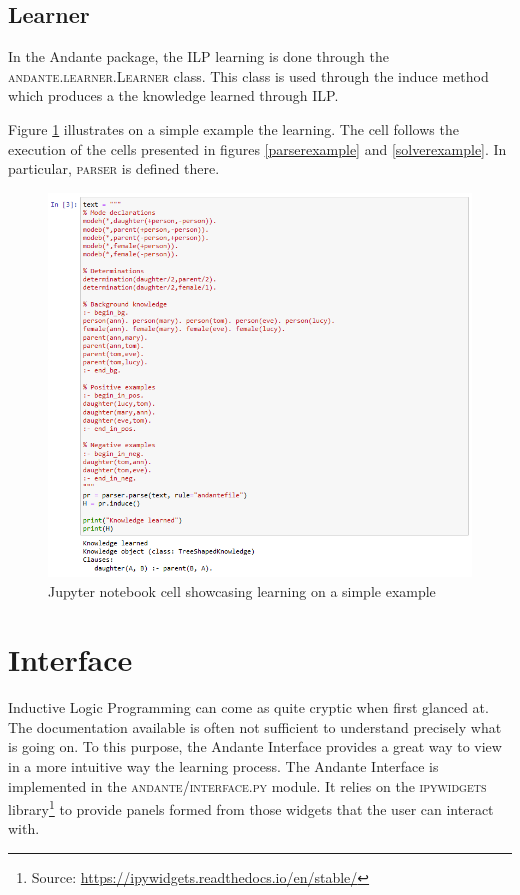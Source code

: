 \documentclass{article}
\begin{document}
\subsection{Learner} \label{ilp:learner}

In the Andante package, the ILP learning is done through the 
\textsc{andante.learner.Learner} class. This class is used through the induce
method which produces a the knowledge learned through ILP.

Figure \ref{learnerexample} illustrates on a simple example the learning. The 
cell follows the execution of the cells presented in figures 
\ref{parserexample} and \ref{solverexample}. In particular, \textsc{parser} is
defined there.

\begin{figure}[h!]
    \includegraphics[width = \textwidth]{images/Learner example.PNG}
    \caption{Jupyter notebook cell showcasing learning on a simple example}
    \label{learnerexample}
\end{figure}

\section{Interface} \label{interface}

Inductive Logic Programming can come as quite cryptic when first glanced at.
The documentation available is often not sufficient to understand precisely
what is going on. To this purpose, the Andante Interface provides a great way
to view in a more intuitive way the learning process. The Andante Interface is
implemented in the \textsc{andante/interface.py} module. It relies on the
\textsc{ipywidgets} library\footnote{Source:
\url{https://ipywidgets.readthedocs.io/en/stable/}} to provide panels formed
from those widgets that the user can interact with.
\end{document}
